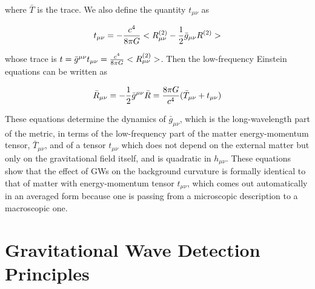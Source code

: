 \documentclass[binding=0.6cm, LaM]{sapthesis}
\begin{document}
	where ${\bar T}$ is the trace.
	We also define the quantity $t_{\mu\nu}$ as

		\begin{equation}
		t_{\mu\nu} = -{{c^4}\over{8\pi G}}<R_{\mu\nu}^{(2)} - {1 \over 2}{\bar g_{\mu \nu}}R^{(2)}>
		\end{equation}

	whose trace is $t= {\bar g^{\mu\nu}}t_{\mu\nu} = {{c^4}\over{8\pi G}}<R_{\mu\nu}^{(2)}>$.
	Then the low-frequency Einstein equations can be written as

		\begin{equation}
		 {\bar R_{\mu\nu}} = -{1 \over 2}{\bar g^{\mu\nu}} {\bar R} =  {{8\pi G}\over c^4}({\bar T_{\mu\nu}}+t_{\mu\nu})
		\end{equation}

	These equations determine the dynamics of $\bar g_{\mu\nu}$, which is the long-wavelength part of the metric, 
	in terms of the low-frequency part of the matter energy-momentum tensor, $\bar T_{\mu\nu}$, 
	and of a tensor $t_{\mu\nu}$ which does not depend on the external matter but only on the gravitational field itself, 
	and is quadratic in $h_{\mu\nu}$.
	These equations show that the effect of GWs on the background curvature is formally identical to that of matter 
	with energy-momentum tensor $t_{\mu\nu}$, which comes out automatically in an averaged form because 
	one is passing from a microscopic description to a macroscopic one.


\section{Gravitational Wave Detection Principles}
\end{document}
